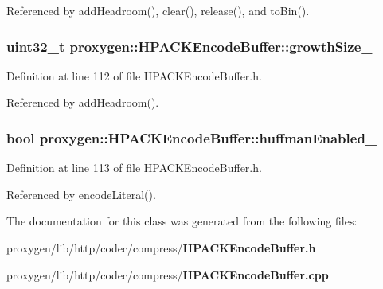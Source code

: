 Referenced by add\+Headroom(), clear(), release(), and to\+Bin().

\subsubsection[{growth\+Size\+\_\+}]{\setlength{\rightskip}{0pt plus 5cm}uint32\+\_\+t proxygen\+::\+H\+P\+A\+C\+K\+Encode\+Buffer\+::growth\+Size\+\_\+\hspace{0.3cm}{\ttfamily [private]}}\label{classproxygen_1_1HPACKEncodeBuffer_a811a967d64460e57436d9089b071403f}


Definition at line 112 of file H\+P\+A\+C\+K\+Encode\+Buffer.\+h.



Referenced by add\+Headroom().

\subsubsection[{huffman\+Enabled\+\_\+}]{\setlength{\rightskip}{0pt plus 5cm}bool proxygen\+::\+H\+P\+A\+C\+K\+Encode\+Buffer\+::huffman\+Enabled\+\_\+\hspace{0.3cm}{\ttfamily [private]}}\label{classproxygen_1_1HPACKEncodeBuffer_a89d7c562d1fe25d4edaf4cdab1de5e38}


Definition at line 113 of file H\+P\+A\+C\+K\+Encode\+Buffer.\+h.



Referenced by encode\+Literal().



The documentation for this class was generated from the following files\+:\begin{DoxyCompactItemize}
\item 
proxygen/lib/http/codec/compress/{\bf H\+P\+A\+C\+K\+Encode\+Buffer.\+h}\item 
proxygen/lib/http/codec/compress/{\bf H\+P\+A\+C\+K\+Encode\+Buffer.\+cpp}\end{DoxyCompactItemize}
